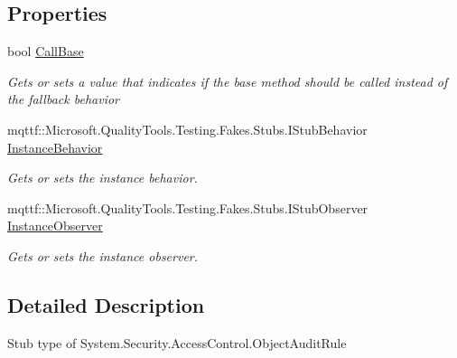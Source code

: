 \subsection*{Properties}
\begin{DoxyCompactItemize}
\item 
bool \hyperlink{class_system_1_1_security_1_1_access_control_1_1_fakes_1_1_stub_object_audit_rule_a85cce2a5f247a701d13413fbecb932d7}{Call\-Base}
\begin{DoxyCompactList}\small\item\em Gets or sets a value that indicates if the base method should be called instead of the fallback behavior\end{DoxyCompactList}\item 
mqttf\-::\-Microsoft.\-Quality\-Tools.\-Testing.\-Fakes.\-Stubs.\-I\-Stub\-Behavior \hyperlink{class_system_1_1_security_1_1_access_control_1_1_fakes_1_1_stub_object_audit_rule_a9f6a97991af9eb04d7f78ed9af8e0a93}{Instance\-Behavior}
\begin{DoxyCompactList}\small\item\em Gets or sets the instance behavior.\end{DoxyCompactList}\item 
mqttf\-::\-Microsoft.\-Quality\-Tools.\-Testing.\-Fakes.\-Stubs.\-I\-Stub\-Observer \hyperlink{class_system_1_1_security_1_1_access_control_1_1_fakes_1_1_stub_object_audit_rule_a63d3e2eac240c42fc5125cbe7a26a573}{Instance\-Observer}
\begin{DoxyCompactList}\small\item\em Gets or sets the instance observer.\end{DoxyCompactList}\end{DoxyCompactItemize}


\subsection{Detailed Description}
Stub type of System.\-Security.\-Access\-Control.\-Object\-Audit\-Rule



